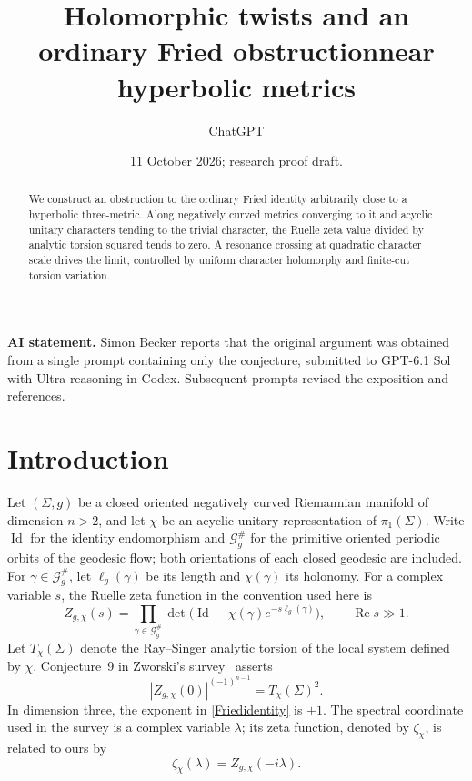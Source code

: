 \documentclass[11pt,letterpaper,reqno]{amsart}
\title[Holomorphic twists and a Fried obstruction]
{Holomorphic twists and an ordinary Fried obstruction\newline near hyperbolic metrics}
\author{ChatGPT}
\date{11 October 2026; research proof draft.}
\theoremstyle{remark}
\newcommand{\Id}{\operatorname{Id}}
\begin{document}
\begin{abstract}
We construct an obstruction to the ordinary Fried identity arbitrarily
close to a hyperbolic three-metric. Along negatively curved metrics
converging to it and acyclic unitary characters tending to the trivial
character, the Ruelle zeta value divided by analytic torsion squared
tends to zero. A resonance crossing at quadratic character scale drives
the limit, controlled by uniform character holomorphy and finite-cut
torsion variation.
\end{abstract}
\maketitle

\noindent\textbf{AI statement.}
Simon Becker reports that the original argument was obtained from a
single prompt containing only the conjecture, submitted to
GPT-6.1 Sol with Ultra reasoning in Codex. Subsequent prompts revised
the exposition and references.

\section{Introduction}

Let $(\Sigma,g)$ be a closed oriented negatively curved Riemannian manifold of dimension
$n>2$, and let $\chi$ be an acyclic unitary representation of
$\pi_1(\Sigma)$. Write $\Id$ for the identity endomorphism and
$\mathcal G_g^{\#}$ for the primitive oriented periodic orbits of the
geodesic flow; both orientations of each closed geodesic are included.
For $\gamma\in\mathcal G_g^{\#}$, let $\ell_g(\gamma)$ be its length
and $\chi(\gamma)$ its holonomy. For a complex variable $s$, the Ruelle
zeta function in the convention used here is
\begin{equation}\label{Euler}
 Z_{g,\chi}(s)=\prod_{\gamma\in\mathcal G_g^{\#}}
 \det\bigl(\Id-\chi(\gamma)e^{-s\ell_g(\gamma)}\bigr),
 \qquad \operatorname{Re}s\gg1.
\end{equation}
Let $T_\chi(\Sigma)$ denote the Ray--Singer analytic torsion of the
local system defined by $\chi$. Conjecture~9 in Zworski's
survey~\cite{Zw} asserts
\begin{equation}\label{Friedidentity}
 |Z_{g,\chi}(0)|^{(-1)^{n-1}}=T_\chi(\Sigma)^2.
\end{equation}
In dimension three,
the exponent in \eqref{Friedidentity} is $+1$. The spectral coordinate
used in the survey is a complex variable $\lambda$; its zeta function,
denoted by $\zeta_\chi$, is related to ours by
\[
 \zeta_\chi(\lambda)=Z_{g,\chi}(-i\lambda).
\]
\end{document}
